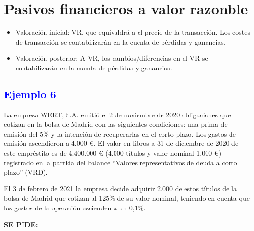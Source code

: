 \newpage
\section{Pasivos financieros a valor razonble}

\begin{itemize}
    \item Valoración inicial: VR, que equivaldrá a el precio de la transacción. Los costes de transacción se contabilizarán en la cuenta de pérdidas y ganancias.
    \item Valoración posterior: A VR, los cambios/diferencias en el VR se contabilizarán en la cuenta de pérdidas y ganancias.
\end{itemize}


\subsection*{\textcolor{blue}{Ejemplo 6}}

La empresa WERT, S.A. emitió el 2 de noviembre de 2020 obligaciones que cotizan en la bolsa de Madrid con las siguientes condiciones: una prima de emisión del 5\% y la intención de recuperarlas en el corto plazo. Los gastos de emisión ascendieron a 4.000 €. El valor en libros a 31 de diciembre de 2020 de este empréstito es de 4.400.000 € (4.000 títulos y valor nominal 1.000 €) registrado en la partida del balance “Valores representativos de deuda a corto plazo” (VRD).

El 3 de febrero de 2021 la empresa decide adquirir 2.000 de estos títulos de la bolsa de Madrid que cotizan al 125\% de su valor nominal, teniendo en cuenta que los gastos de la operación ascienden a un 0,1\%.

\textbf{SE PIDE:}

